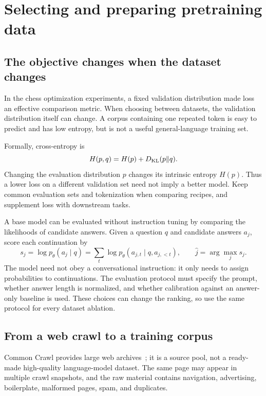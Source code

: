 \chapter{Selecting and preparing pretraining data}
\label{ch:data}

\section{The objective changes when the dataset changes}
In the chess optimization experiments, a fixed validation distribution made loss an effective comparison metric. When choosing between datasets, the validation distribution itself can change. A corpus containing one repeated token is easy to predict and has low entropy, but is not a useful general-language training set.

Formally, cross-entropy is
\[
H(p,q)=H(p)+D_{\rm KL}(p\Vert q).
\]
Changing the evaluation distribution $p$ changes its intrinsic entropy $H(p)$. Thus a lower loss on a different validation set need not imply a better model. Keep common evaluation sets and tokenization when comparing recipes, and supplement loss with downstream tasks.

A base model can be evaluated without instruction tuning by comparing the likelihoods of candidate answers. Given a question $q$ and candidate answers $a_j$, score each continuation by
\[
s_j=\log p_\theta(a_j\mid q)
=\sum_t\log p_\theta(a_{j,t}\mid q,a_{j,<t}),
\qquad \hat j=\arg\max_j s_j.
\]
The model need not obey a conversational instruction: it only needs to assign probabilities to continuations. The evaluation protocol must specify the prompt, whether answer length is normalized, and whether calibration against an answer-only baseline is used. These choices can change the ranking, so use the same protocol for every dataset ablation.

\section{From a web crawl to a training corpus}
Common Crawl provides large web archives~\cite{commoncrawl}; it is a source pool, not a ready-made high-quality language-model dataset. The same page may appear in multiple crawl snapshots, and the raw material contains navigation, advertising, boilerplate, malformed pages, spam, and duplicates.


